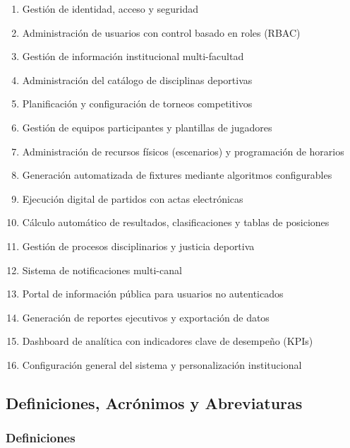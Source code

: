 \documentclass[12pt,a4paper]{article}
\begin{document}
\begin{enumerate}[noitemsep]
    \item Gestión de identidad, acceso y seguridad
    \item Administración de usuarios con control basado en roles (RBAC)
    \item Gestión de información institucional multi-facultad
    \item Administración del catálogo de disciplinas deportivas
    \item Planificación y configuración de torneos competitivos
    \item Gestión de equipos participantes y plantillas de jugadores
    \item Administración de recursos físicos (escenarios) y programación de horarios
    \item Generación automatizada de fixtures mediante algoritmos configurables
    \item Ejecución digital de partidos con actas electrónicas
    \item Cálculo automático de resultados, clasificaciones y tablas de posiciones
    \item Gestión de procesos disciplinarios y justicia deportiva
    \item Sistema de notificaciones multi-canal
    \item Portal de información pública para usuarios no autenticados
    \item Generación de reportes ejecutivos y exportación de datos
    \item Dashboard de analítica con indicadores clave de desempeño (KPIs)
    \item Configuración general del sistema y personalización institucional
\end{enumerate}

\subsection{Definiciones, Acrónimos y Abreviaturas}

\subsubsection{Definiciones}
\end{document}
